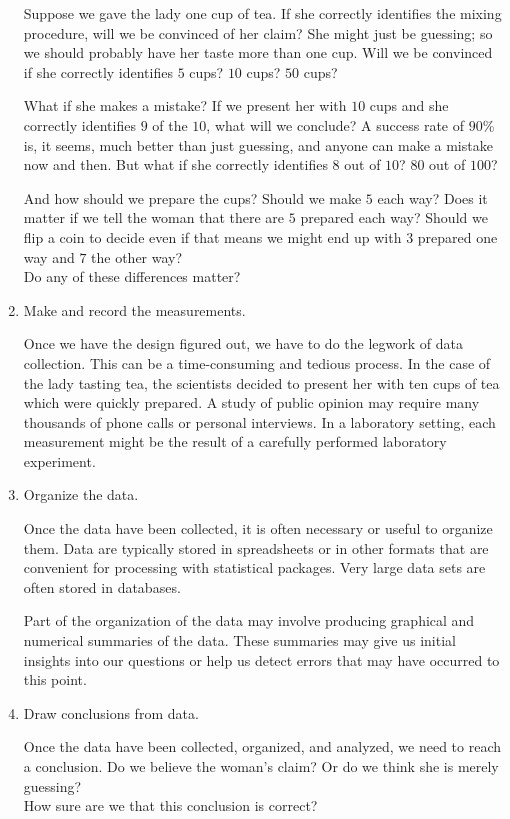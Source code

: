 \documentclass[]{book}
\begin{document}
\begin{enumerate}
  Suppose we gave the lady one cup of tea. If she correctly identifies
  the mixing procedure, will we be convinced of her claim? She might just
  be guessing; so we should probably have her taste more than one
  cup. Will we be convinced if she correctly identifies \(5\) cups? \(10\) cups?
  \(50\) cups?

  What if she makes a mistake? If we present her with \(10\) cups and she
  correctly identifies \(9\) of the \(10\), what will we conclude?
  A success rate of \(90\)\% is, it seems,
  much better than just guessing, and anyone can make a mistake now and then.
  But what if she correctly identifies \(8\) out of \(10\)? \(80\) out of \(100\)?

  And how should we prepare the cups? Should we make \(5\) each way?
  Does it matter if we tell the woman that there are \(5\) prepared
  each way?
  Should we flip a coin to decide even if that means we might end
  up with \(3\) prepared one way and \(7\) the other way?\\
  Do any of these differences matter?
\item
  Make and record the measurements.

  Once we have the design figured out, we have to do the legwork of
  data collection. This can be a time-consuming and tedious process.
  In the case of the lady tasting tea, the scientists decided to
  present her with ten cups of tea which were quickly prepared.
  A study of public opinion may require many thousands of phone calls or
  personal interviews.
  In a laboratory setting, each measurement might be the result
  of a carefully performed laboratory experiment.
\item
  Organize the data.

  Once the data have been collected, it is often necessary or useful
  to organize them. Data are typically stored in spreadsheets or
  in other formats that are convenient for processing with
  statistical packages. Very large data sets are often stored in
  databases.

  Part of the organization of the data may involve producing graphical and
  numerical summaries of the data. These summaries may give us initial
  insights into our questions or help us detect errors that may have occurred
  to this point.
\item
  Draw conclusions from data.

  Once the data have been collected, organized, and analyzed, we need
  to reach a conclusion.
  Do we believe the woman's claim? Or do we think she is merely guessing?\\
  How sure are we that this
  conclusion is correct?


\end{enumerate}
\end{document}
